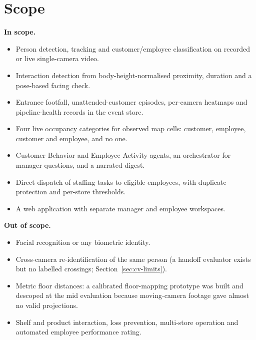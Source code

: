 \section{Scope}
\textbf{In scope.}
\begin{itemize}
\item Person detection, tracking and customer/employee classification on recorded or live single-camera video.
\item Interaction detection from body-height-normalised proximity, duration and a pose-based facing check.
\item Entrance footfall, unattended-customer episodes, per-camera heatmaps and pipeline-health records in the event store.
\item Four live occupancy categories for observed map cells: customer, employee, customer and employee, and no one.
\item Customer Behavior and Employee Activity agents, an orchestrator for manager questions, and a narrated digest.
\item Direct dispatch of staffing tasks to eligible employees, with duplicate protection and per-store thresholds.
\item A web application with separate manager and employee workspaces.
\end{itemize}
\textbf{Out of scope.}
\begin{itemize}
\item Facial recognition or any biometric identity.
\item Cross-camera re-identification of the same person (a handoff evaluator exists but no labelled crossings; Section~\ref{sec:cv-limits}).
\item Metric floor distances: a calibrated floor-mapping prototype was built and descoped at the mid evaluation because moving-camera footage gave almost no valid projections.
\item Shelf and product interaction, loss prevention, multi-store operation and automated employee performance rating.
\end{itemize}

